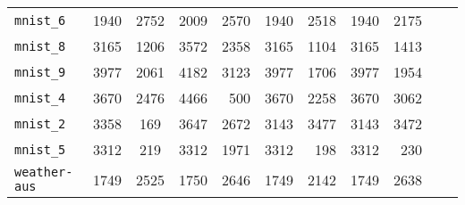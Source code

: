 \begin{tabular}{lccrrrrrrrr}
\texttt{mnist\_6} & 1940 & 2752 & 2009 & 2570 & 1940 & 2518 & 1940 & 2175\\
\texttt{mnist\_8} & 3165 & 1206 & 3572 & 2358 & 3165 & 1104 & 3165 & 1413\\
\texttt{mnist\_9} & 3977 & 2061 & 4182 & 3123 & 3977 & 1706 & 3977 & 1954\\
\texttt{mnist\_4} & 3670 & 2476 & 4466 & 500 & 3670 & 2258 & 3670 & 3062\\
\texttt{mnist\_2} & 3358 & 169 & 3647 & 2672 & 3143 & 3477 & 3143 & 3472\\
\texttt{mnist\_5} & 3312 & 219 & 3312 & 1971 & 3312 & 198 & 3312 & 230\\
\texttt{weather-aus} & 1749 & 2525 & 1750 & 2646 & 1749 & 2142 & 1749 & 2638\\
\bottomrule
\end{tabular}
